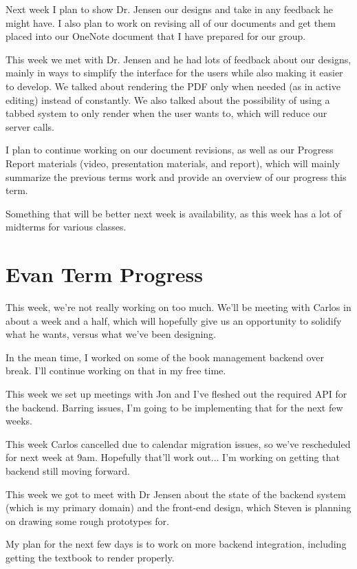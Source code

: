 \documentclass[onecolumn, draftclsnofoot,10pt, compsoc]{IEEEtran}
\begin{document}
Next week I plan to show Dr. Jensen our designs and take in any feedback he
might have. I also plan to work on revising all of our documents and get them
placed into our OneNote document that I have prepared for our group.


This week we met with Dr. Jensen and he had lots of feedback about our designs,
mainly in ways to simplify the interface for the users while also making it
easier to develop. We talked about rendering the PDF only when needed
(as in active editing) instead of constantly. We also talked about the
possibility of using a tabbed system to only render when the user wants to,
which will reduce our server calls.

I plan to continue working on our document revisions, as well as our Progress
Report materials (video, presentation materials, and report), which will mainly
summarize the previous terms work and provide an overview of our progress
this term.

Something that will be better next week is availability, as this week has a
lot of midterms for various classes.


\section{Evan Term Progress}

This week, we're not really working on too much. We'll be meeting with Carlos 
in about a week and a half, which will hopefully give us an opportunity to 
solidify what he wants, versus what we've been designing.

In the mean time, I worked on some of the book management backend over break. 
I'll continue working on that in my free time.


This week we set up meetings with Jon and I've fleshed out the required API 
for the backend. Barring issues, I'm going to be implementing that for the 
next few weeks.

This week Carlos cancelled due to calendar migration issues, so we've 
rescheduled for next week at 9am. Hopefully that'll work out...
I'm working on getting that backend still moving forward. 

This week we got to meet with Dr Jensen about the state of the backend system 
(which is my primary domain) and the front-end design, which Steven is planning 
on drawing some rough prototypes for.

My plan for the next few days is to work on more backend integration, 
including getting the textbook to render properly.
\end{document}
